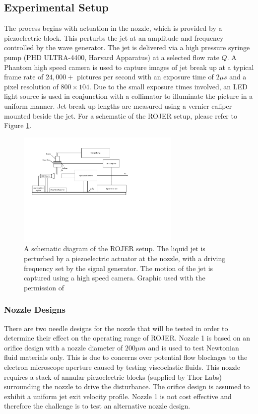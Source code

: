 \documentclass[11pt]{article}
\begin{document}
\subsection{Experimental Setup}
The process begins with actuation in the nozzle, which is provided by a 
piezoelectric block. This perturbs the jet at an amplitude and frequency 
controlled by the wave generator. The jet is delivered via a high pressure 
syringe pump (PHD ULTRA-4400, Harvard Apparatus) at a selected flow rate $Q$. A 
Phantom high speed camera is used to capture images of jet break up at a 
typical frame rate of $24,000 +$ pictures per second with an exposure time of 
$2 \mu s$ and a pixel resolution of $800 \times 104$. Due to the small exposure 
times involved, an LED light source is used in conjunction with a collimator to 
illuminate the picture in a uniform manner. Jet break up lengths are measured 
using a vernier caliper mounted beside the jet. For a schematic of the ROJER 
setup, please refer to Figure \ref{fig:schematic}. 
\begin{figure}[h]
\begin{center}
	\includegraphics[trim=0cm 9cm 8cm 1.5cm, width = 0.7\textwidth]{img/ROJER_schematic.pdf}
	\caption{A schematic diagram of the ROJER setup. The liquid jet is 
perturbed by a piezoelectric actuator at the nozzle, with a driving frequency 
set by the signal generator. The motion of the jet is captured using a high 
speed camera. Graphic used with the permission of \cite{greiciunas2015report}}
	\label{fig:schematic}
\end{center}
\end{figure}

\subsubsection{Nozzle Designs} \label{sec:nozzles}

There are two needle designs for the nozzle that will be tested in order to 
determine their effect on the operating range of ROJER. Nozzle 1 is based on an 
orifice design with a nozzle diameter of $200 \mu m$ and is used to test 
Newtonian fluid materials only. This is due to concerns over potential flow 
blockages to the electron microscope aperture caused by testing viscoelastic 
fluids. This nozzle requires a stack of annular piezoelectric blocks (supplied 
by Thor Labs) surrounding the nozzle to drive the disturbance. The orifice 
design is assumed to exhibit a uniform jet exit velocity profile. Nozzle 1 is 
not cost effective and therefore the challenge is to test an alternative nozzle 
design.
\end{document}
